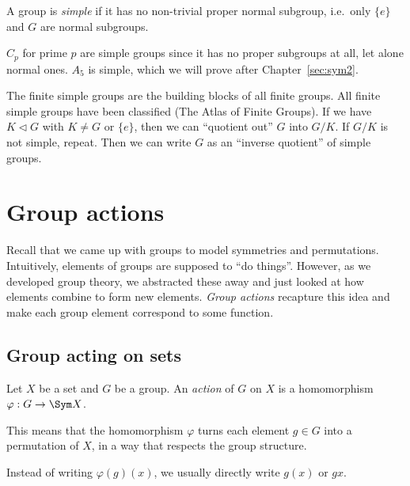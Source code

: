 \documentclass[a4paper]{article}
\begin{document}
\begin{defi}
  A group is \emph{simple} if it has no non-trivial proper normal subgroup, i.e.\ only $\{e\}$ and $G$ are normal subgroups.
\end{defi}

\begin{eg}
  $C_p$ for prime $p$ are simple groups since it has no proper subgroups at all, let alone normal ones.
  $A_5$ is simple, which we will prove after Chapter~\ref{sec:sym2}.
\end{eg}

The finite simple groups are the building blocks of all finite groups. All finite simple groups have been classified (The Atlas of Finite Groups). If we have $K\lhd G$ with $K\not= G$ or $\{e\}$, then we can ``quotient out'' $G$ into $G/K$. If $G/K$ is not simple, repeat. Then we can write $G$ as an ``inverse quotient'' of simple groups.

\section{Group actions}
\label{sec:action}
Recall that we came up with groups to model symmetries and permutations. Intuitively, elements of groups are supposed to ``do things''. However, as we developed group theory, we abstracted these away and just looked at how elements combine to form new elements. \emph{Group actions} recapture this idea and make each group element correspond to some function.

\subsection{Group acting on sets}
\begin{defi}
  Let $X$ be a set and $G$ be a group. An \emph{action} of $G$ on $X$ is a homomorphism $\varphi: G \to \Sym X$.
\end{defi}
This means that the homomorphism $\varphi$ turns each element $g\in G$ into a permutation of $X$, in a way that respects the group structure.

Instead of writing $\varphi(g)(x)$, we usually directly write $g(x)$ or $gx$.
\end{document}
